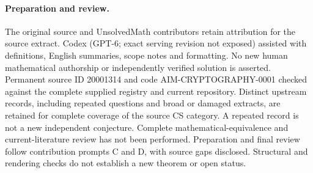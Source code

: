 \documentclass[11pt]{article}
\begin{document}
\paragraph{Preparation and review.}
The original source and UnsolvedMath contributors retain attribution for the source extract. Codex (GPT-6; exact serving revision not exposed) assisted with definitions, English summaries, scope notes and formatting. No new human mathematical authorship or independently verified solution is asserted. Permanent source ID 20001314 and code AIM-CRYPTOGRAPHY-0001 checked against the complete supplied registry and current repository. Distinct upstream records, including repeated questions and broad or damaged extracts, are retained for complete coverage of the source CS category. A repeated record is not a new independent conjecture. Complete mathematical-equivalence and current-literature review has not been performed. Preparation and final review follow contribution prompts C and D, with source gaps disclosed. Structural and rendering checks do not establish a new theorem or open status.
\label{end:20001314}
\end{document}
